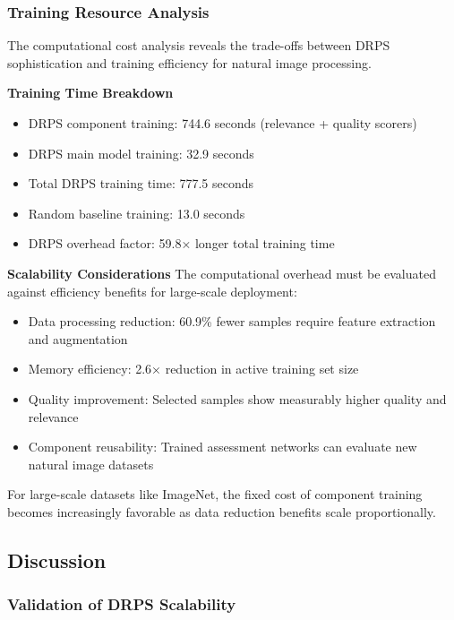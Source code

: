 \documentclass[12pt]{article}
\begin{document}
\subsubsection{Training Resource Analysis}\label{resource-analysis}

The computational cost analysis reveals the trade-offs between DRPS sophistication and training efficiency for natural image processing.

\textbf{Training Time Breakdown}
\begin{itemize}
\item DRPS component training: 744.6 seconds (relevance + quality scorers)
\item DRPS main model training: 32.9 seconds
\item Total DRPS training time: 777.5 seconds
\item Random baseline training: 13.0 seconds
\item DRPS overhead factor: 59.8× longer total training time
\end{itemize}

\textbf{Scalability Considerations}
The computational overhead must be evaluated against efficiency benefits for large-scale deployment:

\begin{itemize}
\item Data processing reduction: 60.9\% fewer samples require feature extraction and augmentation
\item Memory efficiency: 2.6× reduction in active training set size
\item Quality improvement: Selected samples show measurably higher quality and relevance
\item Component reusability: Trained assessment networks can evaluate new natural image datasets
\end{itemize}

For large-scale datasets like ImageNet, the fixed cost of component training becomes increasingly favorable as data reduction benefits scale proportionally.

\subsection{Discussion}\label{discussion}

\subsubsection{Validation of DRPS Scalability}\label{scalability-validation}
\end{document}
